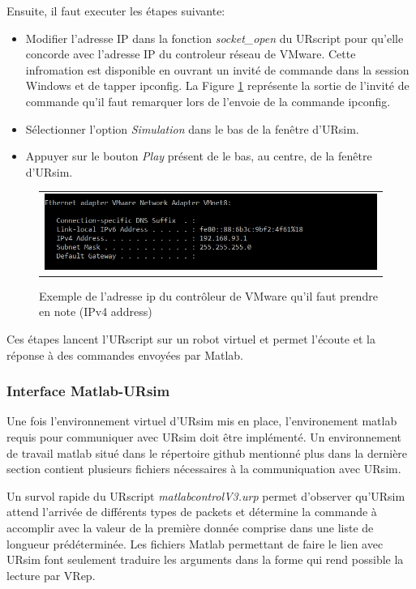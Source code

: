 \documentclass[root.tex]{subfiles}
\begin{document}
Ensuite, il faut executer les étapes suivante:
\begin{itemize}
\item Modifier l'adresse IP dans la fonction \textit{socket\_open} du URscript pour qu'elle concorde avec l'adresse IP du controleur réseau de VMware. Cette infromation est disponible en ouvrant un invité de commande dans la session Windows et de tapper ipconfig. La Figure \ref{fig:windows_ip} représente la sortie de l'invité de commande qu'il faut remarquer lors de l'envoie de la commande ipconfig.
\item Sélectionner l'option \textit{Simulation} dans le bas de la fenêtre d'URsim.
\item Appuyer sur le bouton \textit{Play} présent de le bas, au centre, de la fenêtre d'URsim.
\end{itemize}
\begin{figure}
 \begin{center}
  \begin{tabular}{c}
    \includegraphics[trim=0cm 0cm 0cm 0cm, scale=0.5]{screenshots_tuto_ursim/windows_ip.png}
  \end{tabular}
 \end{center}
\caption{Exemple de l'adresse ip du contrôleur de VMware qu'il faut prendre en note (IPv4 address)}
 \label{fig:windows_ip}
\end{figure}
Ces étapes lancent l'URscript sur un robot virtuel et permet l'écoute et la réponse à des commandes envoyées par Matlab.


\subsubsection{Interface Matlab-URsim}

Une fois l'environnement virtuel d'URsim mis en place, l'environement matlab requis pour communiquer avec URsim doit être implémenté.
Un environnement de travail matlab situé dans le répertoire github mentionné plus dans la dernière section contient plusieurs fichiers nécessaires à la communiquation avec URsim.

Un survol rapide du URscript \textit{matlabcontrolV3.urp} permet d'observer qu'URsim attend l'arrivée de différents types de packets et détermine la commande à accomplir avec la valeur de la première donnée comprise dans une liste de longueur prédéterminée. Les fichiers Matlab permettant de faire le lien avec URsim font seulement traduire les arguments dans la forme qui rend possible la lecture par VRep.
\end{document}
